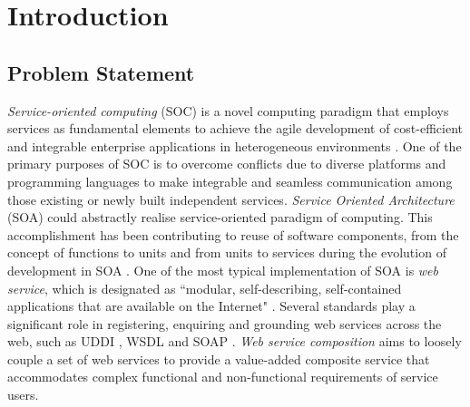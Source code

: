 \chapter{Introduction}\label{C:intro}

\section{Problem Statement}
\emph{Service-oriented computing} (SOC) is a novel computing paradigm that employs services as fundamental elements to achieve the agile development of cost-efficient and integrable enterprise applications in heterogeneous environments \cite{papazoglou2003service, papazoglou2006p}. One of the primary purposes of SOC is to overcome conflicts due to diverse platforms and programming languages to make integrable and seamless communication among those existing or newly built independent services. \emph{Service Oriented Architecture} (SOA)  could abstractly realise service-oriented paradigm of computing. This accomplishment has been contributing to reuse of software components, from the concept of functions to units and from units to services during the evolution of development in SOA \cite{booth2004web, overdick2007resource}. One of the most typical implementation of SOA is \emph{web service}, which is designated as ``modular, self-describing, self-contained applications that are available on the Internet" \cite{curbera2001web}. Several standards play a significant role in registering, enquiring and grounding web services across the web, such as UDDI \cite{curbera2002unraveling}, WSDL \cite{lausen2007semantic} and SOAP \cite{fensel2011semantic}. \emph{Web service composition} aims to loosely couple a set of web services to provide a value-added composite service that accommodates complex functional and non-functional requirements of service users. 

